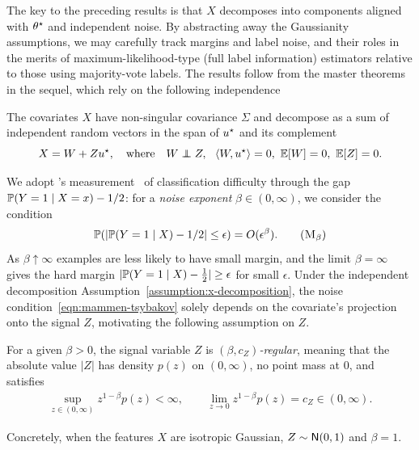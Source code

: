 The key to the preceding results
is that $X$ decomposes into components aligned with
$\theta^\star$ and independent noise.
%
By abstracting away the Gaussianity assumptions, we may carefully track
margins and label noise, and their roles in the merits of
maximum-likelihood-type (full label information) estimators relative to
those using majority-vote labels.
%
The results follow from the master theorems in the sequel, which rely on the
following independence
\begin{assumption}
  \label{assumption:x-decomposition}
  The covariates $X$ have non-singular covariance $\Sigma$ and decompose as a
  sum of independent random vectors in the span of $u^\star$ and its
  complement
  \begin{equation*}
    X = W +  Z u^\star  ,
    ~~~\mbox{where}~~~
    W \perp\!\!\!\!\perp Z  , ~~
    \langle W,u^\star\rangle = 0  ,
    ~ \mathbb{E}[W] = 0  ,
    ~ \mathbb{E}[Z] = 0  .
  \end{equation*}
\end{assumption}
We adopt \citeauthor{MammenTs99}'s
measurement~\citep{MammenTs99} of classification difficulty through the gap
$\mathbb{P}(Y = 1 \mid X = x) - 1/2$:
%
for a \emph{noise exponent} $\beta \in (0, \infty)$, we
consider the condition
\begin{equation}
  \label{eqn:mammen-tsybakov}
  \Prb ( | \Prb(Y = 1 \mid X) - 1/2| \leq \epsilon )
  = O(\epsilon^\beta)  .
  \tag{$\textsc{M}_\beta$}
\end{equation}
As $\beta \uparrow \infty$ examples are less likely to have small margin,
and the limit $\beta=\infty$ gives the hard margin $|\mathbb{P}(Y = 1 \mid X) -
\frac{1}{2}| \ge \epsilon$ for  small $\epsilon$.
%
Under the independent decomposition
Assumption~\ref{assumption:x-decomposition}, the noise
condition~\eqref{eqn:mammen-tsybakov} solely depends on the covariate's
projection onto the signal $Z$, motivating the following assumption on $Z$.
\begin{assumption}
  \label{assumption:z-density}
  For a given $\beta > 0$, the signal variable
  $Z$ is \emph{$(\beta, c_Z)$-regular}, meaning
  that the absolute value $|Z|$ has density $p(z)$ on $(0, \infty)$, no
  point mass at $0$, and satisfies
  \begin{align*}
    \sup_{z \in (0, \infty)} z^{1 - \beta} p(z) < \infty,
    \qquad \lim_{z \to 0}z^{1 - \beta} p(z) = c_Z \in (0, \infty).
  \end{align*}
\end{assumption}
\noindent
Concretely, when the features $X$ are isotropic Gaussian, $Z
\sim \mathsf{N}(0, 1)$ and $\beta=1$.


